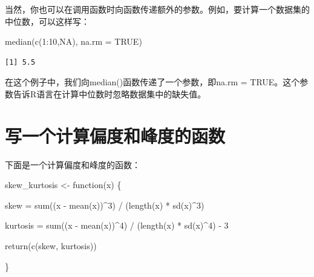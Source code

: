 \documentclass[
  letterpaper,
  DIV=11,
  numbers=noendperiod]{scrreprt}
\newenvironment{Shaded}{\begin{snugshade}}{\end{snugshade}}
\newcommand{\AttributeTok}[1]{\textcolor[rgb]{0.40,0.45,0.13}{#1}}
\newcommand{\ConstantTok}[1]{\textcolor[rgb]{0.56,0.35,0.01}{#1}}
\newcommand{\ControlFlowTok}[1]{\textcolor[rgb]{0.00,0.23,0.31}{#1}}
\newcommand{\DecValTok}[1]{\textcolor[rgb]{0.68,0.00,0.00}{#1}}
\newcommand{\FunctionTok}[1]{\textcolor[rgb]{0.28,0.35,0.67}{#1}}
\newcommand{\NormalTok}[1]{\textcolor[rgb]{0.00,0.23,0.31}{#1}}
\newcommand{\OtherTok}[1]{\textcolor[rgb]{0.00,0.23,0.31}{#1}}
\newcommand{\SpecialCharTok}[1]{\textcolor[rgb]{0.37,0.37,0.37}{#1}}
\begin{document}
当然，你也可以在调用函数时向函数传递额外的参数。例如，要计算一个数据集的中位数，可以这样写：

\begin{Shaded}
\begin{Highlighting}[]
\FunctionTok{median}\NormalTok{(}\FunctionTok{c}\NormalTok{(}\DecValTok{1}\SpecialCharTok{:}\DecValTok{10}\NormalTok{,}\ConstantTok{NA}\NormalTok{), }\AttributeTok{na.rm =} \ConstantTok{TRUE}\NormalTok{)}
\end{Highlighting}
\end{Shaded}

\begin{verbatim}
[1] 5.5
\end{verbatim}

在这个例子中，我们向median()函数传递了一个参数，即na.rm =
TRUE。这个参数告诉R语言在计算中位数时忽略数据集中的缺失值。

\hypertarget{ux5199ux4e00ux4e2aux8ba1ux7b97ux504fux5ea6ux548cux5cf0ux5ea6ux7684ux51fdux6570}{%
\section{写一个计算偏度和峰度的函数}\label{ux5199ux4e00ux4e2aux8ba1ux7b97ux504fux5ea6ux548cux5cf0ux5ea6ux7684ux51fdux6570}}

下面是一个计算偏度和峰度的函数：

\begin{Shaded}
\begin{Highlighting}[]
\NormalTok{skew\_kurtosis }\OtherTok{\textless{}{-}} \ControlFlowTok{function}\NormalTok{(x) \{}

\NormalTok{  skew }\OtherTok{=} \FunctionTok{sum}\NormalTok{((x }\SpecialCharTok{{-}} \FunctionTok{mean}\NormalTok{(x))}\SpecialCharTok{\^{}}\DecValTok{3}\NormalTok{) }\SpecialCharTok{/}\NormalTok{ (}\FunctionTok{length}\NormalTok{(x) }\SpecialCharTok{*} \FunctionTok{sd}\NormalTok{(x)}\SpecialCharTok{\^{}}\DecValTok{3}\NormalTok{)}

\NormalTok{  kurtosis }\OtherTok{=} \FunctionTok{sum}\NormalTok{((x }\SpecialCharTok{{-}} \FunctionTok{mean}\NormalTok{(x))}\SpecialCharTok{\^{}}\DecValTok{4}\NormalTok{) }\SpecialCharTok{/}\NormalTok{ (}\FunctionTok{length}\NormalTok{(x) }\SpecialCharTok{*} \FunctionTok{sd}\NormalTok{(x)}\SpecialCharTok{\^{}}\DecValTok{4}\NormalTok{) }\SpecialCharTok{{-}} \DecValTok{3}

  \FunctionTok{return}\NormalTok{(}\FunctionTok{c}\NormalTok{(skew, kurtosis))}

\NormalTok{\}}
\end{Highlighting}
\end{Shaded}
\end{document}

